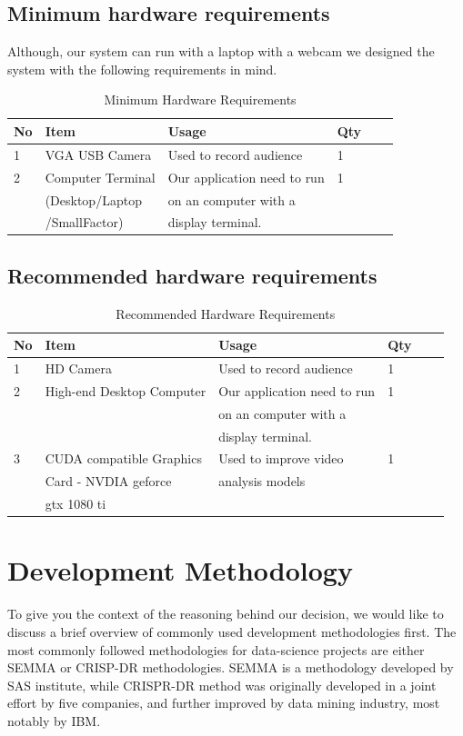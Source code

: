 \documentclass[12pt,a4paper,man]{report}
\begin{document}
\section{Minimum hardware requirements}
\label{sec:org1b327d4}
Although, our system can run with a laptop with a webcam we designed the system with the following requirements in mind.

\begin{table}[htbp]
\caption{\label{table:mreq}
Minimum Hardware Requirements}
\centering
\begin{tabular}{|l|l|l|l|lp{3cm}|}
\hline
No & Item & Usage & Qty\\
\hline
1 & VGA USB Camera & Used to record audience & 1\\
\hline
2 & Computer Terminal & Our application need to run & 1\\
 & (Desktop/Laptop & on an computer with a & \\
 & /SmallFactor) & display terminal. & \\
\hline
\end{tabular}
\end{table}

\section{Recommended hardware requirements}
\label{sec:org600ee62}

\begin{table}[htbp]
\caption{\label{table:mxreq}
Recommended Hardware Requirements}
\centering
\begin{tabular}{|l|l|l|l|lp{3cm}|}
\hline
No & Item & Usage & Qty\\
\hline
1 & HD Camera & Used to record audience & 1\\
2 & High-end Desktop Computer & Our application need to run & 1\\
 &  & on an computer with a & \\
 &  & display terminal. & \\
3 & CUDA compatible Graphics & Used to improve video & 1\\
 & Card - NVDIA geforce & analysis models & \\
 & gtx 1080 ti &  & \\
\hline
\end{tabular}
\end{table}

\chapter{Development Methodology}
\label{sec:orga756572}
To give you the context of the reasoning behind our decision, we would like to discuss a brief overview of commonly used development methodologies first. The most commonly followed methodologies for data-science projects are either SEMMA or CRISP-DR methodologies. SEMMA is a methodology developed by SAS institute, while CRISPR-DR method was originally developed in a joint effort by five companies, and further improved by data mining industry, most notably by IBM. 
\end{document}
